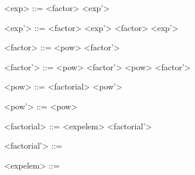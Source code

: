 \begin{grammarEx}
	<exp> ::= <factor> <exp'>
	
	<exp'> ::= \lit{+} <factor> <exp'>
	\alt \lit{-} <factor> <exp'>
	\alt \textepsilon{}

	<factor> ::= <pow> <factor'>
	
	<factor'> ::= \lit{*} <pow> <factor'>
	\alt \lit{/} <pow> <factor'>
	\alt \textepsilon{}

	<pow> ::= <factorial> <pow'>
	
	<pow'> ::= \lit{\^{}} <pow>
	\alt \textepsilon{}

	<factorial> ::= <exp\textunderscore elem> <factorial'>
	
	<factorial'> ::= \lit{!}
	\alt \textepsilon{}

	<exp\textunderscore elem> ::= 
	\alt {}
\end{grammarEx}